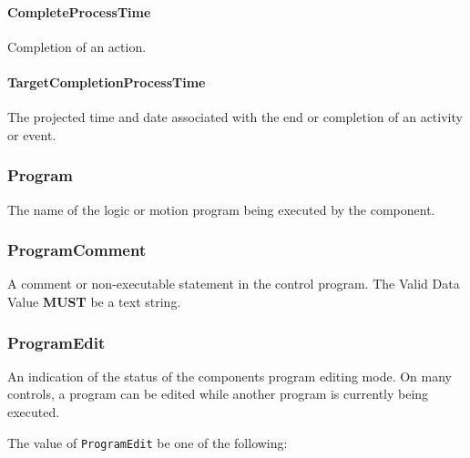 \paragraph{CompleteProcessTime}\mbox{}
\label{sec:CompleteProcessTime}



Completion of an action.


\paragraph{TargetCompletionProcessTime}\mbox{}
\label{sec:TargetCompletionProcessTime}



The projected time and date associated with the end or completion of an activity or event.


\subsubsection{Program}
\label{sec:Program}



The name of the logic or motion program being executed by the  component.

\FloatBarrier

\subsubsection{ProgramComment}
\label{sec:ProgramComment}



A comment or non-executable statement in the control program.
 The \gls{Valid Data Value} \textbf{MUST} be a text string.

\FloatBarrier

\subsubsection{ProgramEdit}
\label{sec:ProgramEdit}



An indication of the status of the  components program editing mode. 
 On many controls, a program can be edited while another program is currently being executed.


The value of \texttt{ProgramEdit} \MUST be one of the following: 


